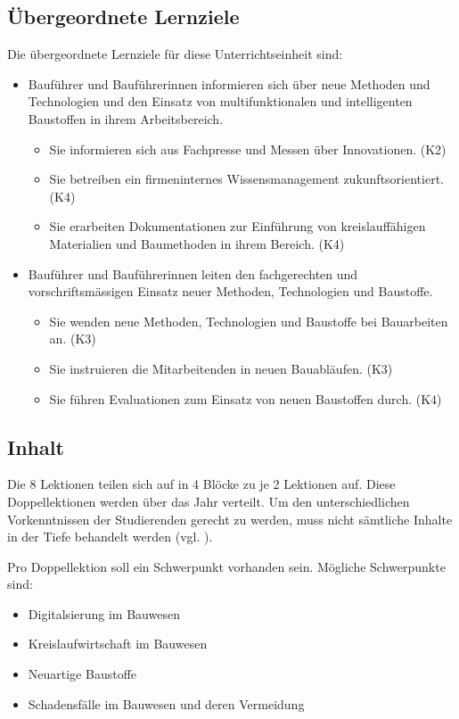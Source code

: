 \documentclass[
11pt,
captions=tableheading,
smallheadings,
headsepline,
footsepline, 
captions=tableheading,
parskip=half-,
]{scrartcl}
\begin{document}
\subsection{Übergeordnete Lernziele}
Die übergeordnete Lernziele für diese Unterrichtseinheit sind:
\begin{itemize}
    \item Bauführer und Bauführerinnen informieren sich über neue Methoden und Technologien und den Einsatz von
          multifunktionalen und intelligenten Baustoffen in ihrem Arbeitsbereich.
          \begin{itemize}
              \item Sie informieren sich aus Fachpresse und Messen über Innovationen. (K2)
              \item Sie betreiben ein firmeninternes Wissensmanagement zukunftsorientiert. (K4)
              \item Sie erarbeiten Dokumentationen zur Einführung von kreislauffähigen Materialien und Baumethoden
                    in ihrem Bereich. (K4)
          \end{itemize}
    \item Bauführer und Bauführerinnen leiten den fachgerechten und vorschriftsmässigen Einsatz neuer Methoden,
          Technologien und Baustoffe.
          \begin{itemize}
              \item Sie wenden neue Methoden, Technologien und Baustoffe bei Bauarbeiten an. (K3)
              \item Sie instruieren die Mitarbeitenden in neuen Bauabläufen. (K3)
              \item Sie führen Evaluationen zum Einsatz von neuen Baustoffen durch. (K4)
          \end{itemize}
\end{itemize}

\subsection{Inhalt}
Die 8 Lektionen teilen sich auf in 4 Blöcke zu je 2 Lektionen auf.
Diese Doppellektionen werden über das Jahr verteilt.
Um den unterschiedlichen Vorkenntnissen der Studierenden gerecht zu werden, muss nicht sämtliche Inhalte in der Tiefe behandelt werden (vgl. ).


Pro Doppellektion soll ein Schwerpunkt vorhanden sein.
Mögliche Schwerpunkte sind:
\begin{itemize}
    \item Digitalsierung im Bauwesen
    \item Kreislaufwirtschaft im Bauwesen
    \item Neuartige Baustoffe
    \item Schadensfälle im Bauwesen und deren Vermeidung
\end{itemize}
\end{document}
